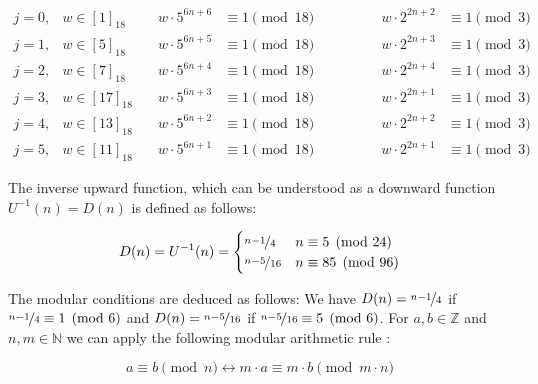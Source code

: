 \begin{equation}
\label{eq:homomorphism_congruences}
\begin{array}{llllll}
	j=0, & w\in [1]_{18} & \hspace{1em} w\cdot5^{6n+6}&\equiv1\pmod{18}&\hspace{4em}w\cdot2^{2n+2} &\equiv1\pmod{3}\\
	j=1, & w\in [5]_{18} & \hspace{1em} w\cdot5^{6n+5}&\equiv1\pmod{18}&\hspace{4em}w\cdot2^{2n+3} &\equiv1\pmod{3}\\
	j=2, & w\in [7]_{18} & \hspace{1em} w\cdot5^{6n+4}&\equiv1\pmod{18}&\hspace{4em}w\cdot2^{2n+4} &\equiv1\pmod{3}\\
	j=3, & w\in [17]_{18} & \hspace{1em} w\cdot5^{6n+3}&\equiv1\pmod{18}&\hspace{4em}w\cdot2^{2n+1} &\equiv1\pmod{3}\\
	j=4, & w\in [13]_{18} & \hspace{1em} w\cdot5^{6n+2}&\equiv1\pmod{18}&\hspace{4em}w\cdot2^{2n+2} &\equiv1\pmod{3}\\
	j=5, & w\in [11]_{18} & \hspace{1em} w\cdot5^{6n+1}&\equiv1\pmod{18}&\hspace{4em}w\cdot2^{2n+1} &\equiv1\pmod{3}
\end{array}
\end{equation}

The inverse upward function, which can be understood as a downward function $U^{-1}(n)=D(n)$ is defined as follows:

\[
D(n)=U^{-1}(n)=\begin{cases}
	\nicefrac{n-1}{4}	&	n\equiv 5\pmod{24}\\
	\nicefrac{n-5}{16}	&	n\equiv 85\pmod{96}
\end{cases}
\]

The modular conditions are deduced as follows: We have $D(n)=\nicefrac{n-1}{4}$ if $\nicefrac{n-1}{4}\equiv1\pmod6$ and $D(n)=\nicefrac{n-5}{16}$ if $\nicefrac{n-5}{16}\equiv5\pmod6$. For $a,b\in\mathbb{Z}$ and $n,m\in\mathbb{N}$ we can apply the following modular arithmetic rule \cite[p.~21]{Ref_Mueller-Stach_2011}:

\begin{equation}
a\equiv b\pmod n \leftrightarrow m\cdot a\equiv m\cdot b\pmod{m\cdot n}
\end{equation}


